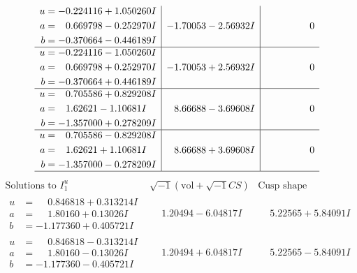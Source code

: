 \documentclass[1p]{elsarticle_modified}
\theoremstyle{definition}
\newcommand{\I}{\sqrt{-1}}
\begin{document}
$$\begin{array}{c|c|c}
\begin{aligned}
u &= -0.224116 + 1.050260 I \\
a &= \phantom{-}0.669798 - 0.252970 I \\
b &= -0.370664 - 0.446189 I\end{aligned}
 & -1.70053 - 2.56932 I & \phantom{-0.000000 } 0 \\ \hline\begin{aligned}
u &= -0.224116 - 1.050260 I \\
a &= \phantom{-}0.669798 + 0.252970 I \\
b &= -0.370664 + 0.446189 I\end{aligned}
 & -1.70053 + 2.56932 I & \phantom{-0.000000 } 0 \\ \hline\begin{aligned}
u &= \phantom{-}0.705586 + 0.829208 I \\
a &= \phantom{-}1.62621 - 1.10681 I \\
b &= -1.357000 + 0.278209 I\end{aligned}
 & \phantom{-}8.66688 - 3.69608 I & \phantom{-0.000000 } 0 \\ \hline\begin{aligned}
u &= \phantom{-}0.705586 - 0.829208 I \\
a &= \phantom{-}1.62621 + 1.10681 I \\
b &= -1.357000 - 0.278209 I\end{aligned}
 & \phantom{-}8.66688 + 3.69608 I & \phantom{-0.000000 } 0\\
 \hline 
 \end{array}$$\newpage$$\begin{array}{c|c|c}  
\text{Solutions to }I^u_{1}& \I (\text{vol} + \sqrt{-1}CS) & \text{Cusp shape}\\
 \hline 
\begin{aligned}
u &= \phantom{-}0.846818 + 0.313214 I \\
a &= \phantom{-}1.80160 + 0.13026 I \\
b &= -1.177360 + 0.405721 I\end{aligned}
 & \phantom{-}1.20494 - 6.04817 I & \phantom{-}5.22565 + 5.84091 I \\ \hline\begin{aligned}
u &= \phantom{-}0.846818 - 0.313214 I \\
a &= \phantom{-}1.80160 - 0.13026 I \\
b &= -1.177360 - 0.405721 I\end{aligned}
 & \phantom{-}1.20494 + 6.04817 I & \phantom{-}5.22565 - 5.84091 I \\ \hline\begin{aligned}

\end{aligned}
\end{array}$$
\end{document}
